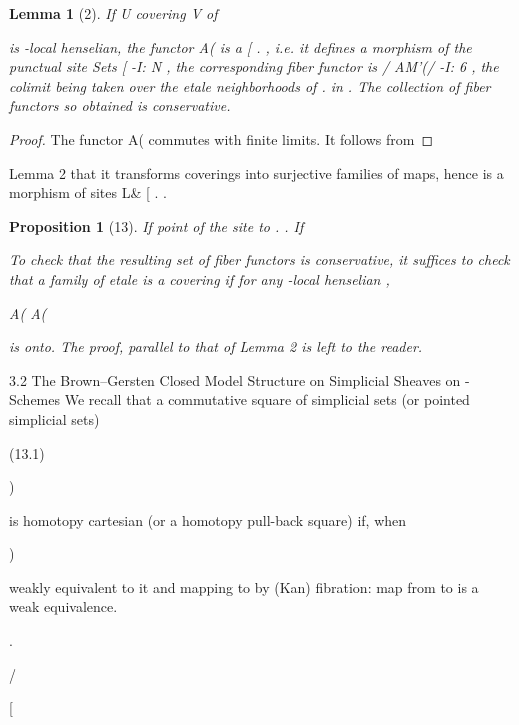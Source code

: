 \documentclass[11pt,a4paper]{article}
\theoremstyle{plain}
\newtheorem{lemma}[theorem]{Lemma}
\newtheorem{proposition}[theorem]{Proposition}
\theoremstyle{definition}
\begin{document}
\begin{lemma}[2]
If U
covering V of

 is -local henselian, the functor   A(  is a
[ .   , i.e. it defines a morphism of the punctual site Sets
[ 
  -I:  N , the corresponding fiber functor is / 
AM'(/ -I: 6 , the colimit being taken over the etale neighborhoods of . in
 . The collection of fiber functors so obtained is conservative.
\end{lemma}

\begin{proof} The functor   A(  commutes with finite limits. It follows from
\end{proof}

Lemma 2 that it transforms coverings into surjective families of maps, hence is a
morphism of sites L\&
[ .   .
\begin{proposition}[13]
If
point of the site
to
.   . If



To check that the resulting set of fiber functors is conservative, it suffices to check
that a family of etale 
is a covering if for any -local henselian ,


 





A(   A( 


is onto. The proof, parallel to that of Lemma 2 is left to the reader.

\end{proposition}

3.2 The Brown--Gersten Closed Model Structure on Simplicial
Sheaves on -Schemes
We recall that a commutative square of simplicial sets (or pointed simplicial sets)

  



(13.1)

 )

is homotopy cartesian (or a homotopy pull-back square) if, when

)

 weakly equivalent to it and mapping to
by (Kan) fibration:
map from to 
is a weak equivalence.

.

/

[ 
\end{document}
